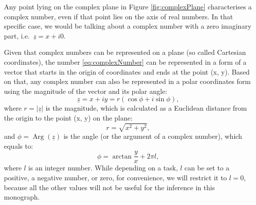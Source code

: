 \documentclass[
]{book}
\DeclareMathOperator\Arg{Arg}
\begin{document}
Any point lying on the complex plane in Figure \ref{fig:complexPlane} characterises a complex number, even if that point lies on the axis of real numbers. In that specific case, we would be talking about a complex number with a zero imaginary part, i.e.~\(\underline{z}=x+i0\).

Given that complex numbers can be represented on a plane (so called Cartesian coordinates), the number \eqref{eq:complexNumber} can be represented in a form of a vector that starts in the origin of coordinates and ends at the point (x, y). Based on that, any complex number can also be represented in a polar coordinates form using the magnitude of the vector and its polar angle:
\begin{equation}
    \underline{z} = x+iy = r (\cos \phi + i \sin \phi),
    \label{eq:complexNumberTrigonometric}
\end{equation}
where \(r=|\underline{z}|\) is the magnitude, which is calculated as a Euclidean distance from the origin to the point (x, y) on the plane:
\begin{equation}
    r = \sqrt{x^2 + y^2},
    \label{eq:complexNumberMagnitude}
\end{equation}
and \(\phi=\Arg(\underline{z})\) is the angle (or the argument of a complex number), which equals to:
\begin{equation}
    \phi = \arctan \frac{y}{x} + 2 \pi l,
    \label{eq:complexNumberAngle}
\end{equation}
where \(l\) is an integer number. While depending on a task, \(l\) can be set to a positive, a negative number, or zero, for convenience, we will restrict it to \(l=0\), because all the other values will not be useful for the inference in this monograph.
\end{document}
